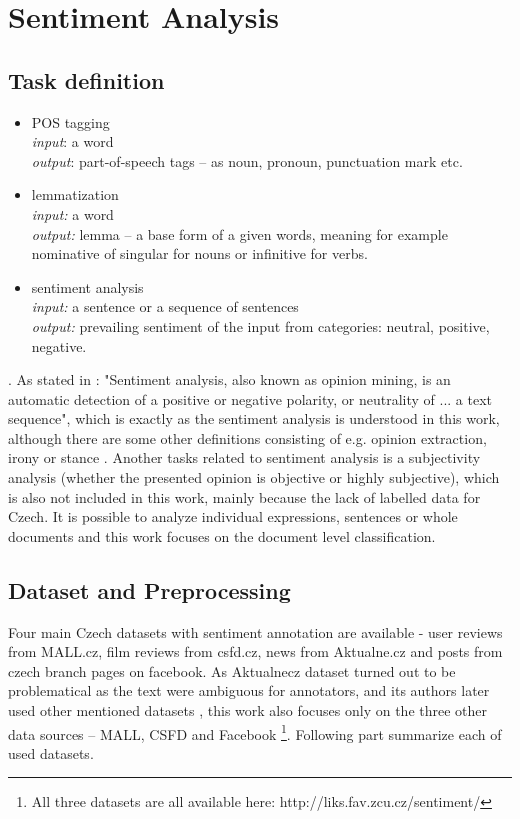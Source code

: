 \section{Sentiment Analysis}
\label{chap:sent}
\subsection{Task definition}
\begin{itemize}
\item POS tagging \\
\textit{input}: a word \\
\textit{output}: part-of-speech tags -- as noun, pronoun, punctuation mark etc.
\item lemmatization \\
\textit{input:} a word \\
\textit{output:} lemma -- a base form of a given words, meaning for example nominative of singular for nouns or infinitive for verbs. 
\item sentiment analysis \\
\textit{input:} a sentence or a sequence of sentences \\
\textit{output:} prevailing sentiment of the input from categories: neutral, positive, negative.
\end{itemize}.
As stated in \citep{Veselovska}: "Sentiment analysis, also known as opinion mining, is an automatic detection of a positive or negative polarity, or neutrality of ... a text sequence", which is exactly as the sentiment analysis is understood in this work, although there are some other definitions consisting of e.g. opinion extraction, irony or stance \citep{Montoyo2012}. Another tasks related to sentiment analysis is a subjectivity analysis (whether the presented opinion is objective or highly subjective), which is also not included in this work, mainly because the lack of labelled data for Czech. It is possible to analyze individual expressions, sentences or whole documents \citep{Veselovska} and this work focuses on the document level classification.
\subsection{Dataset and Preprocessing}
Four main Czech datasets with sentiment annotation are available - user reviews from MALL.cz, film reviews from csfd.cz, news from Aktualne.cz and posts from czech branch pages on facebook. As Aktualnecz dataset turned out to be problematical as the text were ambiguous for annotators, and its authors later used other mentioned datasets \citep{Veselovska}, this work also focuses only on the three other data sources -- MALL, CSFD and Facebook \footnote{All three datasets are all available here: http://liks.fav.zcu.cz/sentiment/}. Following part summarize each of used datasets.
